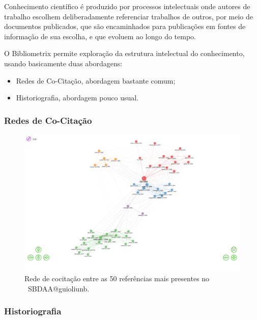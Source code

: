 Conhecimento científico é produzido por processos intelectuais onde autores de trabalho escolhem deliberadamente referenciar trabalhos de outros, por meio de documentos publicados, que são encaminhados para publicações em fontes de informação de sua escolha, e que evoluem ao longo do tempo.

O Bibliometrix permite exploração da estrutura intelectual do conhecimento, usando basicamente duas abordagens:
\begin{itemize}
    \item Redes de Co-Citação, abordagem bastante comum;
    \item Historiografia, abordagem pouco usual.
\end{itemize}

\subsubsection{Redes de Co-Citação}

\begin{figure}
    \centering
    \includegraphics[width=1\textwidth]{experiments/jhcf/PesqBibliogr/SimulacaoMultiagente/WoS-20220203/Estrutura/Intelectual/MASSA2-CoCitation-Network-50-Papers.png}
    \caption{Rede de cocitação entre as 50 referências mais presentes no  \dataset\ SBDAA@guioliunb.}
    \label{fig:MASSA2-CoCitation-Network}
\end{figure}

\subsubsection{Historiografia}

